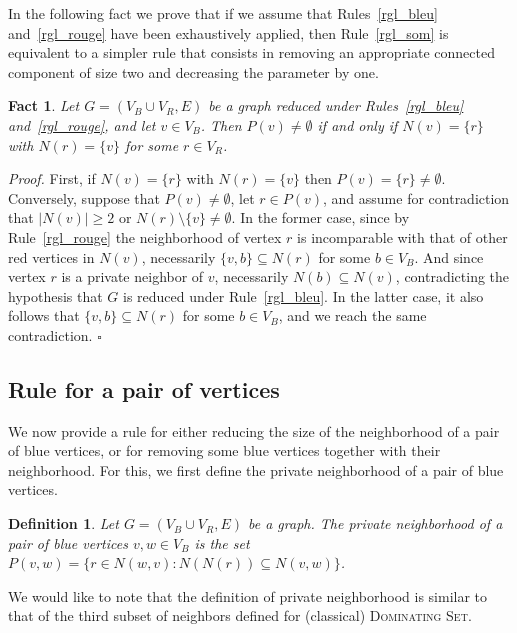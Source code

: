 \documentclass[a4paper,11pt]{article}
\newtheorem{fait} {Fact}
\newtheorem{defi} {Definition}
\newcommand{\rrgl}   [1] {Rule~\ref{#1}\xspace}
\newcommand{\dom}    [0] {\textsc{Dominating Set}\xspace}
\newenvironment{proof}{\noindent \textit{Proof. }}{\hfill$\square$\vspace{.2cm}}
\begin{document}
In the following fact we prove that if we assume that Rules~\ref{rgl_bleu} and~\ref{rgl_rouge} have been exhaustively applied, then \rrgl{rgl_som} is equivalent to a simpler rule that consists in removing an appropriate connected component of size two and decreasing the parameter by one.

\begin{fait}
Let  $G=(V_B\cup V_R,E)$ be a graph reduced under Rules~\ref{rgl_bleu} and~\ref{rgl_rouge}, and let $v \in V_B$. Then $P(v) \neq \emptyset$ if and only if $N(v)=\{r\}$ with $N(r)= \{v\}$ for some $r \in V_R$.
\end{fait}

\begin{proof}
First, if $N(v)=\{r\}$ with $N(r)= \{v\}$ then $P(v)=\{r\} \neq \emptyset$. Conversely, suppose that $P(v) \neq \emptyset$, let $r \in P(v)$,  and assume for contradiction that  $|N(v)| \geq 2$ or $N(r) \setminus \{v\} \neq \emptyset$. In the former case,  since by Rule~\ref{rgl_rouge} the neighborhood of vertex $r$ is incomparable  with that of other red vertices in $N(v)$, necessarily $\{v,b\} \subseteq N(r)$ for some $b \in V_B$. And since vertex $r$ is a private neighbor of $v$, necessarily $N(b) \subseteq N(v)$, contradicting the hypothesis that $G$ is reduced under Rule~\ref{rgl_bleu}. In the latter case, it also follows that $\{v,b\} \subseteq N(r)$ for some $b \in V_B$, and we reach the same contradiction. \end{proof}

\subsection{Rule for a pair of vertices} \label{Rpair}

We now provide a rule for either reducing the size of the neighborhood of a pair of blue vertices, or for removing some blue vertices together with their neighborhood. For this, we first define the private neighborhood of a pair of blue vertices.

\begin{defi}
Let $G=(V_B\cup V_R,E)$ be a graph. The \emph{private neighborhood} of a pair of blue vertices $v,w \in V_B$ is the set $P(v,w) = \{r \in N(w,v) : N(N(r)) \subseteq N(v,w) \}$.
\end{defi}

We would like to note that the definition of private neighborhood is similar to that of the third subset of neighbors defined for (classical) \dom \cite{AFN04}.
\end{document}
